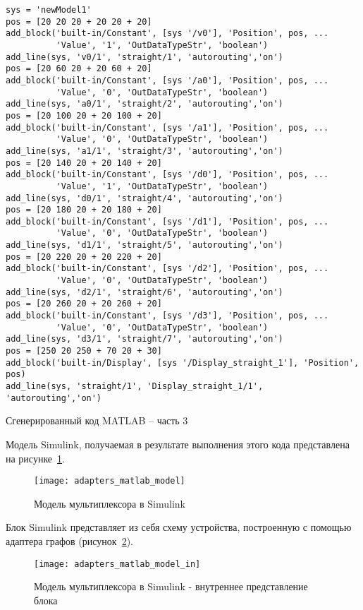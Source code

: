 \documentclass[document.tex]{subfiles}
\begin{document}
\clearpage

\begin{listing}[ht]
\begin{verbatim}
sys = 'newModel1'
pos = [20 20 20 + 20 20 + 20]
add_block('built-in/Constant', [sys '/v0'], 'Position', pos, ...
          'Value', '1', 'OutDataTypeStr', 'boolean')
add_line(sys, 'v0/1', 'straight/1', 'autorouting','on')
pos = [20 60 20 + 20 60 + 20]
add_block('built-in/Constant', [sys '/a0'], 'Position', pos, ...
          'Value', '0', 'OutDataTypeStr', 'boolean')
add_line(sys, 'a0/1', 'straight/2', 'autorouting','on')
pos = [20 100 20 + 20 100 + 20]
add_block('built-in/Constant', [sys '/a1'], 'Position', pos, ...
          'Value', '0', 'OutDataTypeStr', 'boolean')
add_line(sys, 'a1/1', 'straight/3', 'autorouting','on')
pos = [20 140 20 + 20 140 + 20]
add_block('built-in/Constant', [sys '/d0'], 'Position', pos, ...
          'Value', '1', 'OutDataTypeStr', 'boolean')
add_line(sys, 'd0/1', 'straight/4', 'autorouting','on')
pos = [20 180 20 + 20 180 + 20]
add_block('built-in/Constant', [sys '/d1'], 'Position', pos, ...
          'Value', '0', 'OutDataTypeStr', 'boolean')
add_line(sys, 'd1/1', 'straight/5', 'autorouting','on')
pos = [20 220 20 + 20 220 + 20]
add_block('built-in/Constant', [sys '/d2'], 'Position', pos, ...
          'Value', '0', 'OutDataTypeStr', 'boolean')
add_line(sys, 'd2/1', 'straight/6', 'autorouting','on')
pos = [20 260 20 + 20 260 + 20]
add_block('built-in/Constant', [sys '/d3'], 'Position', pos, ...
          'Value', '0', 'OutDataTypeStr', 'boolean')
add_line(sys, 'd3/1', 'straight/7', 'autorouting','on')
pos = [250 20 250 + 70 20 + 30]
add_block('built-in/Display', [sys '/Display_straight_1'], 'Position', pos)
add_line(sys, 'straight/1', 'Display_straight_1/1', 'autorouting','on')
\end{verbatim}
\caption{Сгенерированный код MATLAB -- часть 3}
\label{lst:extmatlabgencode3}
\end{listing}

\clearpage

Модель Simulink, получаемая в результате выполнения этого кода представлена на
рисунке~\ref{fig:adapters_matlab_model}.

\begin{figure}[here]
\texttt{[image: adapters\_matlab\_model]}
\caption{Модель мультиплексора в Simulink}
\label{fig:adapters_matlab_model}
\end{figure}

\clearpage

Блок Simulink представляет из себя схему устройства, построенную с помощью
адаптера графов (рисунок~\ref{fig:adapters_matlab_model_in}).

\begin{figure}[here]
\texttt{[image: adapters\_matlab\_model\_in]}
\caption{Модель мультиплексора в Simulink - внутреннее представление блока}
\label{fig:adapters_matlab_model_in}
\end{figure}
\end{document}
